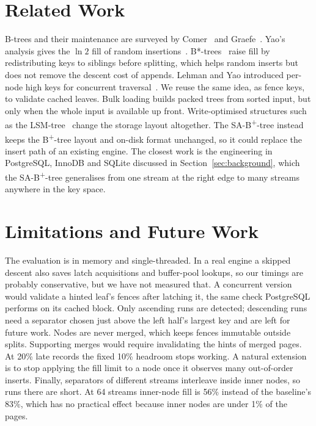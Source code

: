 \documentclass[conference]{IEEEtran}
\newcommand{\sab}{SA-B\textsuperscript{+}-tree}
\newcommand{\bp}{B\textsuperscript{+}-tree}
\begin{document}
\section{Related Work}
B-trees and their maintenance are surveyed by Comer~\cite{comer1979} and
Graefe~\cite{graefe2011}. Yao's analysis gives the $\ln 2$ fill of random
insertions~\cite{yao1978}. B*-trees~\cite{knuth1998} raise fill by
redistributing keys to siblings before splitting, which helps random inserts
but does not remove the descent cost of appends. Lehman and Yao introduced
per-node high keys for concurrent traversal~\cite{lehman1981}. We reuse the
same idea, as fence keys, to validate cached leaves. Bulk loading builds
packed trees from sorted input, but only when the whole input is available
up front. Write-optimised structures such as the LSM-tree~\cite{oneil1996}
change the storage layout altogether. The \sab{} instead keeps the \bp{}
layout and on-disk format unchanged, so it could replace the insert path of
an existing engine. The closest work is the engineering in PostgreSQL,
InnoDB and SQLite discussed in Section~\ref{sec:background}, which the \sab{}
generalises from one stream at the right edge to many streams anywhere in the
key space.

\section{Limitations and Future Work}
The evaluation is in memory and single-threaded. In a real engine a skipped
descent also saves latch acquisitions and buffer-pool lookups, so our timings
are probably conservative, but we have not measured that. A concurrent
version would validate a hinted leaf's fences after latching it, the same
check PostgreSQL performs on its cached block. Only ascending runs are
detected; descending runs need a separator chosen just above the left half's
largest key and are left for future work. Nodes are never merged, which keeps
fences immutable outside splits. Supporting merges would require invalidating
the hints of merged pages. At 20\% late records the fixed 10\% headroom stops
working. A natural extension is to stop applying the fill limit to a node once
it observes many out-of-order inserts. Finally, separators of different
streams interleave inside inner nodes, so runs there are short. At 64
streams inner-node fill is 56\% instead of the baseline's 83\%, which has no
practical effect because inner nodes are under 1\% of the pages.
\end{document}
